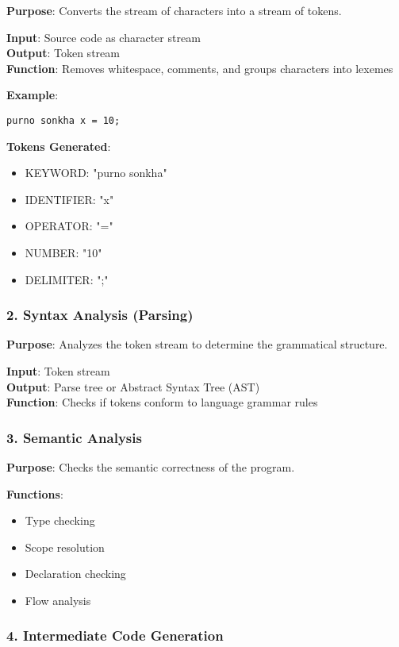 \documentclass[12pt,a4paper]{article}
\begin{document}
\textbf{Purpose}: Converts the stream of characters into a stream of tokens.

\textbf{Input}: Source code as character stream\\
\textbf{Output}: Token stream\\
\textbf{Function}: Removes whitespace, comments, and groups characters into lexemes

\textbf{Example}:
\begin{lstlisting}[caption=Banglish Code Input]
purno sonkha x = 10;
\end{lstlisting}

\textbf{Tokens Generated}:
\begin{itemize}
    \item KEYWORD: "purno sonkha"
    \item IDENTIFIER: "x"
    \item OPERATOR: "="
    \item NUMBER: "10"
    \item DELIMITER: ";"
\end{itemize}

\subsubsection{2. Syntax Analysis (Parsing)}

\textbf{Purpose}: Analyzes the token stream to determine the grammatical structure.

\textbf{Input}: Token stream\\
\textbf{Output}: Parse tree or Abstract Syntax Tree (AST)\\
\textbf{Function}: Checks if tokens conform to language grammar rules

\subsubsection{3. Semantic Analysis}

\textbf{Purpose}: Checks the semantic correctness of the program.

\textbf{Functions}:
\begin{itemize}
    \item Type checking
    \item Scope resolution
    \item Declaration checking
    \item Flow analysis
\end{itemize}

\subsubsection{4. Intermediate Code Generation}
\end{document}
